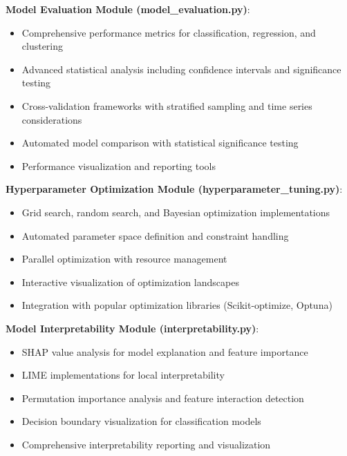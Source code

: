 \textbf{Model Evaluation Module (model\_evaluation.py)}:
\begin{itemize}
    \item Comprehensive performance metrics for classification, regression, and clustering
    \item Advanced statistical analysis including confidence intervals and significance testing
    \item Cross-validation frameworks with stratified sampling and time series considerations
    \item Automated model comparison with statistical significance testing
    \item Performance visualization and reporting tools
\end{itemize}

\textbf{Hyperparameter Optimization Module (hyperparameter\_tuning.py)}:
\begin{itemize}
    \item Grid search, random search, and Bayesian optimization implementations
    \item Automated parameter space definition and constraint handling
    \item Parallel optimization with resource management
    \item Interactive visualization of optimization landscapes
    \item Integration with popular optimization libraries (Scikit-optimize, Optuna)
\end{itemize}

\textbf{Model Interpretability Module (interpretability.py)}:
\begin{itemize}
    \item SHAP value analysis for model explanation and feature importance
    \item LIME implementations for local interpretability
    \item Permutation importance analysis and feature interaction detection
    \item Decision boundary visualization for classification models
    \item Comprehensive interpretability reporting and visualization
\end{itemize}

